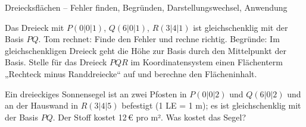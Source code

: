 \begin{aufgabe}{Dreiecksflächen – Fehler finden, Begründen, Darstellungswechsel, Anwendung}
\begin{teile}
\teil Das Dreieck mit $P(0 | 0 | 1)$, $Q(6 | 0 | 1)$, $R(3 | 4 | 1)$ ist gleichschenklig mit der Basis $PQ$. Tom rechnet:  Finde den Fehler und rechne richtig.
\teil Begründe: Im gleichschenkligen Dreieck geht die Höhe zur Basis durch den Mittelpunkt der Basis.
\teil Stelle für das Dreieck $PQR$ im Koordinatensystem einen Flächenterm „Rechteck minus Randdreiecke“ auf und berechne den Flächeninhalt.

\begin{ksys}[xmin=-1,xmax=6,ymin=-1,ymax=5]    \end{ksys}
\teil Ein dreieckiges Sonnensegel ist an zwei Pfosten in $P(0 | 0 | 2)$ und $Q(6 | 0 | 2)$ und an der Hauswand in $R(3 | 4 | 5)$ befestigt (1 LE = 1 m); es ist gleichschenklig mit der Basis $PQ$. Der Stoff kostet 12\,€ pro m². Was kostet das Segel? \leerfeld[€]
\end{teile}
\end{aufgabe}
